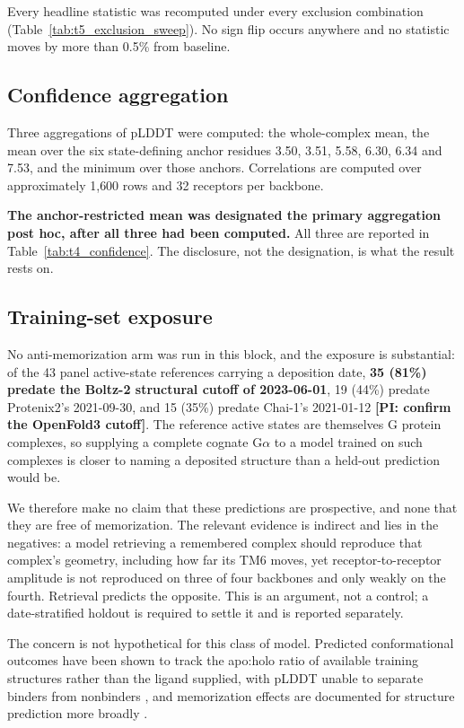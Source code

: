 Every headline statistic was recomputed under every exclusion combination
(Table~\ref{tab:t5_exclusion_sweep}). No sign flip occurs anywhere and no statistic moves by more than
0.5\% from baseline.

\subsection*{Confidence aggregation}

Three aggregations of pLDDT were computed: the whole-complex mean, the mean over
the six state-defining anchor residues 3.50, 3.51, 5.58, 6.30, 6.34 and 7.53,
and the minimum over those anchors. Correlations are computed over approximately
1{,}600 rows and 32 receptors per backbone.

\textbf{The anchor-restricted mean was designated the primary aggregation post
hoc, after all three had been computed.} All three are reported in Table~\ref{tab:t4_confidence}. The
disclosure, not the designation, is what the result rests on.

\subsection*{Training-set exposure}

No anti-memorization arm was run in this block, and the exposure is
substantial: of the 43 panel active-state references carrying a deposition date,
\textbf{35 (81\%) predate the Boltz-2 structural cutoff of 2023-06-01}, 19
(44\%) predate Protenix2's 2021-09-30, and 15 (35\%) predate Chai-1's
2021-01-12 \textbf{[PI: confirm the OpenFold3 cutoff]}. The reference active
states are themselves G protein complexes, so supplying a complete cognate
G$\alpha$ to a model trained on such complexes is closer to naming a deposited
structure than a held-out prediction would be.

We therefore make no claim that these predictions are prospective, and none
that they are free of memorization. The relevant evidence is indirect and lies
in the negatives: a model retrieving a remembered complex should reproduce that
complex's geometry, including how far its TM6 moves, yet receptor-to-receptor
amplitude is not reproduced on three of four backbones and only weakly on the
fourth. Retrieval predicts the opposite. This is an argument, not a control; a
date-stratified holdout is required to settle it and is reported separately.

The concern is not hypothetical for this class of model. Predicted conformational
outcomes have been shown to track the apo:holo ratio of available training
structures rather than the ligand supplied, with pLDDT unable to separate binders
from nonbinders \citep{yu2026domainmotion}, and memorization effects are
documented for structure prediction more broadly \citep{swapna2025memorization}.

